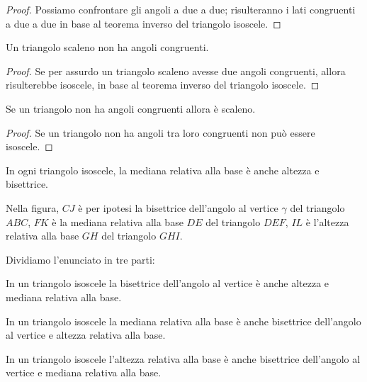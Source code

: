 \begin{proof}
Possiamo confrontare gli angoli a due a due; risulteranno i lati congruenti a due a due in base al teorema inverso del triangolo isoscele.
\end{proof}

\begin{corollario}
Un triangolo scaleno non ha angoli congruenti.
\end{corollario}

\begin{proof}
Se per assurdo un triangolo scaleno avesse due angoli congruenti, allora risulterebbe isoscele, in base al teorema inverso del triangolo isoscele.
\end{proof}

\begin{corollario}
Se un triangolo non ha angoli congruenti allora è scaleno.
\end{corollario}

\begin{proof}
Se un triangolo non ha angoli tra loro congruenti non può essere isoscele.
\end{proof}

\begin{proposizione}
In ogni triangolo isoscele, la mediana relativa alla base è anche altezza e bisettrice.
\end{proposizione}
Nella figura, $CJ$ è per ipotesi la bisettrice dell'angolo al vertice $\gamma$ del triangolo $ABC$, $FK$ è la mediana relativa alla base $DE$ del triangolo $DEF$, $IL$ è l'altezza relativa alla base $GH$ del triangolo $GHI$.

\begin{figure}[htb]
\centering
\end{figure}

Dividiamo l'enunciato in tre parti:
\begin{enumeratea}
\item In un triangolo isoscele la bisettrice dell'angolo al vertice è anche altezza e mediana relativa alla base.
\item In un triangolo isoscele la mediana relativa alla base è anche bisettrice dell'angolo al vertice e altezza relativa alla base.
\item In un triangolo isoscele l'altezza relativa alla base è anche bisettrice dell'angolo al vertice e mediana relativa alla base.
\end{enumeratea}

